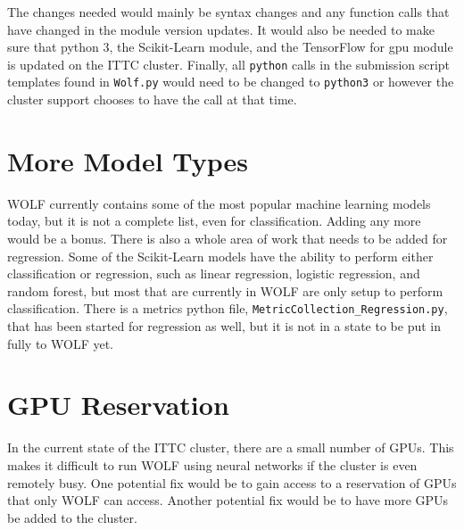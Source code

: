 The changes needed would mainly be syntax changes and any function calls that have changed in the module version updates. It would also be needed to make sure that python 3, the Scikit-Learn module, and the TensorFlow for gpu module is updated on the ITTC cluster. Finally, all {\tt python} calls in the submission script templates found in {\tt Wolf.py} would need to be changed to {\tt python3} or however the cluster support chooses to have the call at that time.

\section*{More Model Types}
WOLF currently contains some of the most popular machine learning models today, but it is not a complete list, even for classification. Adding any more would be a bonus. There is also a whole area of work that needs to be added for regression. Some of the Scikit-Learn models have the ability to perform either classification or regression, such as linear regression, logistic regression, and random forest, but most that are currently in WOLF are only setup to perform classification. There is a metrics python file, {\tt MetricCollection\_Regression.py}, that has been started for regression as well, but it is not in a state to be put in fully to WOLF yet.

\section*{GPU Reservation}
In the current state of the ITTC cluster, there are a small number of GPUs. This makes it difficult to run WOLF using neural networks if the cluster is even remotely busy. One potential fix would be to gain access to a reservation of GPUs that only WOLF can access. Another potential fix would be to have more GPUs be added to the cluster.